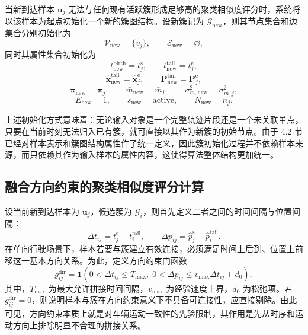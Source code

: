 \documentclass{xdupgthesis}
\begin{document}
当新到达样本 $\mathbf{u}_j$ 无法与任何现有活跃簇形成足够高的聚类相似度评分时，系统将以该样本为起点初始化一个新的簇图结构。设新簇记为 $\mathcal{G}_{\mathrm{new}}$，则其节点集合和边集合分别初始化为
\begin{equation}
	\mathcal{V}_{\mathrm{new}}=\{v_j\}, \qquad
	\mathcal{E}_{\mathrm{new}}=\varnothing,
\end{equation}
同时其属性集合初始化为
\begin{equation}
	t_{\mathrm{new}}^{\mathrm{birth}} = t_j^{\mathrm{s}}, \qquad
	t_{\mathrm{new}}^{\mathrm{tail}} = t_j^{\mathrm{e}},
\end{equation}
\begin{equation}
	\hat{\mathbf{x}}_{\mathrm{new}}^{\mathrm{tail}} = \hat{\mathbf{x}}_j^{\mathrm{e}}, \qquad
	\mathbf{P}_{\mathrm{new}}^{\mathrm{tail}} = \mathbf{P}_j^{\mathrm{e}},
\end{equation}
\begin{equation}
	\boldsymbol{\pi}_{\mathrm{new}} = \boldsymbol{\pi}_j, \qquad
	\bar m_{\mathrm{new}} = \bar m_j, \qquad
	\sigma_{m,\mathrm{new}}^{2} = \sigma_{m,j}^{2},
\end{equation}
\begin{equation}
	E_{\mathrm{new}} = 1, \qquad
	s_{\mathrm{new}} = \mathrm{active}, \qquad
	N_{\mathrm{new}} = n_j.
\end{equation}

上述初始化方式意味着：无论输入对象是一个完整轨迹片段还是一个未关联单点，只要在当前时刻无法归入已有簇，就可直接以其作为新簇的初始节点。由于 4.2 节已经对样本表示和簇图结构属性作了统一定义，因此簇初始化过程并不依赖样本来源，而只依赖其作为输入样本的属性内容，这使得算法整体结构更加统一。

\subsection{融合方向约束的聚类相似度评分计算}

设当前新到达样本为 $\mathbf{u}_j$，候选簇为 $\mathcal{G}_i$，则首先定义二者之间的时间间隔与位置间隔：
\begin{equation}
	\Delta t_{ij}=t_j^{\mathrm{s}}-t_i^{\mathrm{tail}}, \qquad
	\Delta p_{ij}=\hat p_j^{\mathrm{s}}-\hat p_i^{\mathrm{tail}}.
\end{equation}
在单向行驶场景下，样本若要与簇建立有效连接，必须满足时间上后到、位置上前移这一基本方向关系。为此，定义方向约束门函数
\begin{equation}
	g_{ij}^{\mathrm{dir}}=
	\mathbf{1}\!\left(
	0<\Delta t_{ij}\le T_{\max},
	\;
	0<\Delta p_{ij}\le v_{\max}\Delta t_{ij}+d_0
	\right),
\end{equation}
其中，$T_{\max}$ 为最大允许拼接时间间隔，$v_{\max}$ 为经验速度上界，$d_0$ 为松弛项。若 $g_{ij}^{\mathrm{dir}}=0$，则说明样本与簇在方向约束意义下不具备可连接性，应直接剔除。由此可见，方向约束本质上就是对车辆运动一致性的先验限制，其作用是先从时序和运动方向上排除明显不合理的拼接关系。
\end{document}
